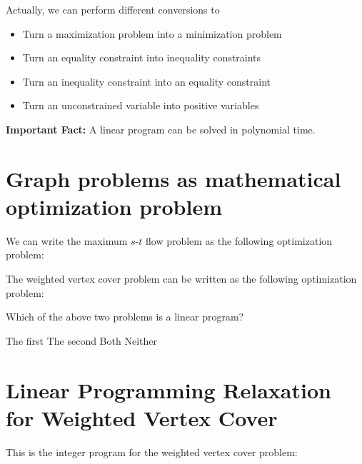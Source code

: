 \documentclass[11  pt]{article}
\begin{document}
Actually, we can perform different conversions to

\begin{itemize}
	\item Turn a maximization problem into a minimization problem \\
	
	\vs{2cm}
	
	\item Turn an equality constraint into inequality constraints \\
	
		\vs{2cm}
	
	
	\item Turn an inequality constraint into an equality constraint \\
	
		\vs{2cm}
	
	\item Turn an unconstrained variable into positive variables \\
\end{itemize}


\vfill

\textbf{Important Fact:} A linear program can be solved in polynomial time.

\newpage

\section{Graph problems as mathematical optimization problem}
We can write the maximum $s$-$t$ flow problem as the following optimization problem:


\vfill

The weighted vertex cover problem can be written as the following optimization problem:
\vfill

\begin{Qu}
	Which of the above two problems is a linear program?
	\begin{itemize}
		\aitem The first
		\bitem The second
		\citem Both
		\ditem Neither
	\end{itemize}
\end{Qu}

\newpage



\section{Linear Programming Relaxation for Weighted Vertex Cover}
This is the integer program for the weighted vertex cover problem:
\end{document}
